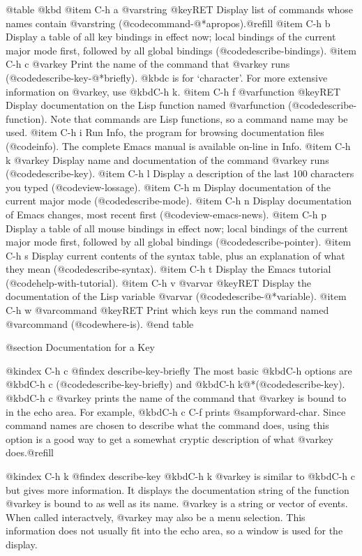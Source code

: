 {{@table @kbd
@item C-h a @var{string} @key{RET}
Display list of commands whose names contain @var{string}
(@code{command-@*apropos}).@refill
@item C-h b
Display a table of all key bindings in effect now; local bindings of
the current major mode first, followed by all global bindings
(@code{describe-bindings}).
@item C-h c @var{key}
Print the name of the command that @var{key} runs (@code{describe-key-@*briefly}).
@kbd{c} is for `character'.  For more extensive information on @var{key},
use @kbd{C-h k}.
@item C-h f @var{function} @key{RET}
Display documentation on the Lisp function named @var{function}
(@code{describe-function}).  Note that commands are Lisp functions, so
a command name may be used.
@item C-h i
Run Info, the program for browsing documentation files (@code{info}).
The complete Emacs manual is available on-line in Info.
@item C-h k @var{key}
Display name and documentation of the command @var{key} runs (@code{describe-key}).
@item C-h l
Display a description of the last 100 characters you typed
(@code{view-lossage}).
@item C-h m
Display documentation of the current major mode (@code{describe-mode}).
@item C-h n
Display documentation of Emacs changes, most recent first
(@code{view-emacs-news}).
@item C-h p
Display a table of all mouse bindings in effect now; local bindings
of the current major mode first, followed by all global bindings
(@code{describe-pointer}).
@item C-h s
Display current contents of the syntax table, plus an explanation of
what they mean (@code{describe-syntax}).
@item C-h t
Display the Emacs tutorial (@code{help-with-tutorial}).
@item C-h v @var{var} @key{RET}
Display the documentation of the Lisp variable @var{var}
(@code{describe-@*variable}).
@item C-h w @var{command} @key{RET}
Print which keys run the command named @var{command} (@code{where-is}).
@end table

@section Documentation for a Key

@kindex C-h c
@findex describe-key-briefly
  The most basic @kbd{C-h} options are @kbd{C-h c}
(@code{describe-key-briefly}) and @kbd{C-h k}@*(@code{describe-key}).
@kbd{C-h c @var{key}} prints the name of the command that @var{key} is
bound to in the echo area.  For example, @kbd{C-h c C-f} prints
@samp{forward-char}.  Since command names are chosen to describe what
the command does, using this option is a good way to get a somewhat cryptic
description of what @var{key} does.@refill

@kindex C-h k
@findex describe-key
  @kbd{C-h k @var{key}} is similar to @kbd{C-h c} but gives more
information.  It displays the documentation string of the function
@var{key} is bound to as well as its name.  @var{key} is a string or
vector of events.  When called interactvely, @var{key} may also be a menu
selection.  This information does not usually fit into the echo area, so a
window is used for the display.

}}
